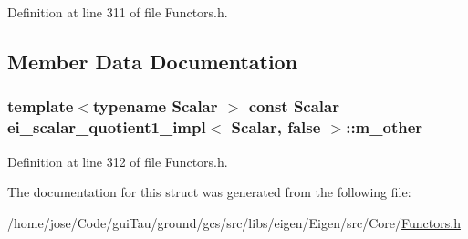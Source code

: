Definition at line 311 of file Functors.\-h.



\subsection{Member Data Documentation}
\hypertarget{structei__scalar__quotient1__impl_3_01_scalar_00_01false_01_4_a1ca9e7a1249ab8b43bd691099080beb5}{
\subsubsection[{m\-\_\-other}]{\setlength{\rightskip}{0pt plus 5cm}template$<$typename Scalar $>$ const Scalar {\bf ei\-\_\-scalar\-\_\-quotient1\-\_\-impl}$<$ Scalar, false $>$\-::m\-\_\-other}}\label{structei__scalar__quotient1__impl_3_01_scalar_00_01false_01_4_a1ca9e7a1249ab8b43bd691099080beb5}


Definition at line 312 of file Functors.\-h.



The documentation for this struct was generated from the following file\-:\begin{DoxyCompactItemize}
\item 
/home/jose/\-Code/gui\-Tau/ground/gcs/src/libs/eigen/\-Eigen/src/\-Core/\hyperlink{_core_2_functors_8h}{Functors.\-h}\end{DoxyCompactItemize}
